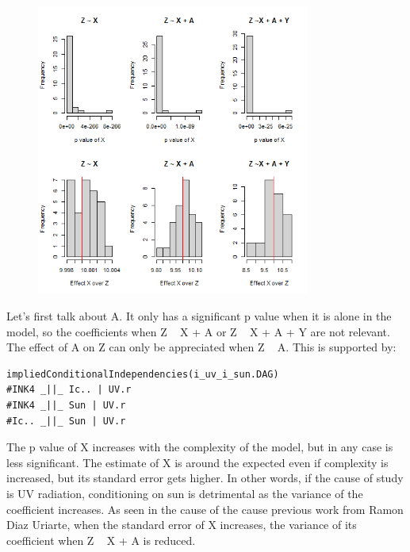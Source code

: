 \documentclass{article}
\begin{document}
\begin{figure}[h]
\includegraphics[width=9cm]{histX.sun.png}
\centering
\end{figure} 
\newpage
Let's first talk about A. It only has a significant p value when it is alone in the model, so the coefficients when Z ~ X + A or Z ~ X + A + Y are not relevant. The effect of A on Z can only be appreciated when Z ~ A. This is supported by:

\begin{lstlisting}
impliedConditionalIndependencies(i_uv_i_sun.DAG)
#INK4 _||_ Ic.. | UV.r
#INK4 _||_ Sun | UV.r
#Ic.. _||_ Sun | UV.r
\end{lstlisting}

The p value of X increases with the complexity of the model, but in any case is less significant. The estimate of X is around the expected even if complexity is increased, but its standard error gets higher. In other words, if the cause of study is UV radiation, conditioning on sun is detrimental as the variance of the coefficient increases.
As seen in the cause of the cause previous work from Ramon Diaz Uriarte, when the standard error of X increases, the variance of its coefficient when Z ~ X + A is reduced.
\end{document}
